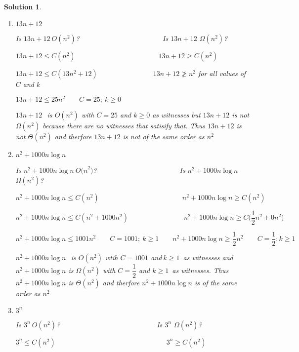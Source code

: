 \documentclass{article}
\newtheorem{solution}[theorem]{Solution}
\begin{document}
\begin{solution}
${}$

\begin{enumerate}
\item $13n+12$

\qquad Is $13n+12~O(n^{2})$?$\qquad \qquad \qquad \qquad \qquad \qquad $Is $%
13n+12$ $\Omega (n^{2})$?

\qquad $13n+12\leq C(n^{2})\qquad \qquad \qquad \qquad \qquad \qquad
13n+12\geq C(n^{2})$

\qquad $13n+12\leq C(13n^{2}+12)\qquad \qquad \qquad \qquad 13n+12\not\geq
n^{2}$ for all values of $C$ and $k$

\qquad $13n+12\leq 25n^{2}\qquad C=25;\ k\geq 0$

\qquad $13n+12~$\ is $O(n^{2})$ with $C=25$ and $k\geq 0$ as witnesses but $%
13n+12$ is not $\Omega (n^{2})$ because there are no witnesses that satisify
that. Thus $13n+12$ is not $\Theta (n^{2})$ and therfore $13n+12$ is not of
\qquad the same order as $n^{2}$

\item $n^{2}+1000n\log {n}$

\qquad Is $n^{2}+1000n\log {n\ O(n}^{2})$?$\qquad \qquad \qquad \qquad
\qquad \qquad $Is $n^{2}+1000n\log {n}$ $\Omega (n^{2})$?

\qquad $n^{2}+1000n\log {n}\leq C(n^{2})\qquad \qquad \qquad \qquad \qquad
\qquad n^{2}+1000n\log {n}\geq C(n^{2})$

\qquad $n^{2}+1000n\log {n}\leq C(n^{2}+1000n^{2})\qquad \qquad \qquad
\qquad n^{2}+1000n\log {n\geq C(}\dfrac{1}{2}{n}^{2}+0n^{2})$

\qquad $n^{2}+1000n\log {n}\leq 1001n^{2}\qquad C=1001;\ k\geq 1\qquad
n^{2}+1000n\log {n\geq }\dfrac{1}{2}{n}^{2}\qquad C=\dfrac{1}{2};k\geq 1$

\qquad $n^{2}+1000n\log {n}~$\ is $O(n^{2})$ wtih $C=1001$ and$\ k\geq 1$\
as witnesses and $n^{2}+1000n\log {n}$ is  $\Omega (n^{2})$ with $C=\dfrac{1%
}{2}$ and $k\geq 1$\ as witnesses. Thus $n^{2}+1000n\log {n}$ is  $\Theta
(n^{2})$ and therfore $n^{2}+1000n\log {n}$  is of the same order as $n^{2}$

\item $3^{n}$

\qquad Is $3^{n}~O(n^{2})$?$\qquad \qquad \qquad \qquad \qquad \qquad \qquad 
$Is $3^{n}$ $\Omega (n^{2})$?

\qquad $3^{n}\leq C(n^{2})\qquad \qquad \qquad \qquad \qquad \qquad \qquad
\qquad 3^{n}\geq C(n^{2})$


\end{enumerate}
\end{solution}
\end{document}
